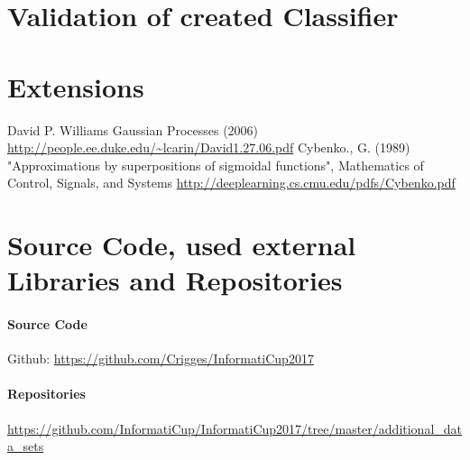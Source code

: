 \documentclass[paper=A4,pagesize=auto,12pt,headinclude=true,footinclude=true,BCOR=0mm,DIV=calc]{scrartcl}
\begin{document}
	
	\section{Validation of created Classifier}
	
	\section{Extensions}
	
	
	
	\newpage
	
	\begin{thebibliography}{xxxxxx}
		 David P. Williams Gaussian Processes (2006) \url{http://people.ee.duke.edu/~lcarin/David1.27.06.pdf}
		  Cybenko., G. (1989) "Approximations by superpositions of sigmoidal functions", Mathematics of Control, Signals, and Systems \url{http://deeplearning.cs.cmu.edu/pdfs/Cybenko.pdf}
	\end{thebibliography}
	
	
	\section{Source Code, used external Libraries and Repositories}
	\paragraph{Source Code}
	Github: \url{https://github.com/Crigges/InformatiCup2017}\\
	\paragraph{Repositories}
	\label{src:Repositories}
	\url{https://github.com/InformatiCup/InformatiCup2017/tree/master/additional_data_sets}
	
\end{document}
